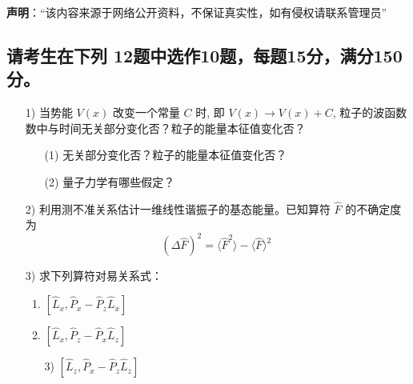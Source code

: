 
\textbf{声明}：“该内容来源于网络公开资料，不保证真实性，如有侵权请联系管理员”

\subsection{请考生在下列 12题中选作10题，每题15分，满分150分。}
\begin{enumerate}

    \item[1)] 当势能 $V(x)$ 改变一个常量 $C$ 时, 即 $V(x) \rightarrow V(x) + C$, 粒子的波函数数中与时间无关部分变化否？粒子的能量本征值变化否？
    \begin{enumerate}
        \item[(1)] 无关部分变化否？粒子的能量本征值变化否？
        \item[(2)] 量子力学有哪些假定？
    \end{enumerate}

    \item[2)] 利用测不准关系估计一维线性谐振子的基态能量。已知算符 $\hat{F}$ 的不确定度为
    \[
    (\Delta \hat{F})^2 = \langle \hat{F}^2 \rangle - \langle \hat{F} \rangle^2~
    \]

    \item[3)] 求下列算符对易关系式：
    \begin{enumerate}
        \item $[\hat{L}_x, \hat{P}_x - \hat{P}_z \hat{L}_x]$
        \item $[\hat{L}_x, \hat{P}_z - \hat{P}_x \hat{L}_z]$
        \item[3)] $[\hat{L}_z, \hat{P}_x - \hat{P}_z \hat{L}_z]$
    \end{enumerate}

\end{enumerate}
